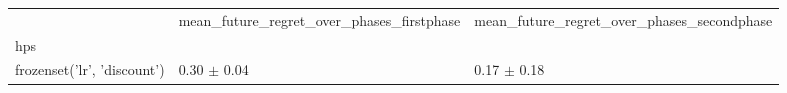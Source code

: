 \begin{tabular}{lll}
\toprule
 & mean_future_regret_over_phases_firstphase & mean_future_regret_over_phases_secondphase \\
hps &  &  \\
\midrule
frozenset({'lr', 'discount'}) & 0.30 $\pm$ 0.04 & 0.17 $\pm$ 0.18 \\
\bottomrule
\end{tabular}
